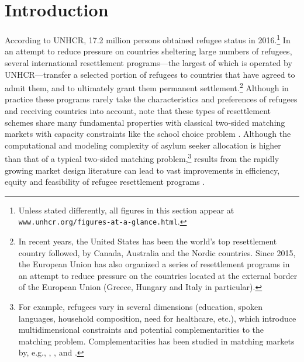 \documentclass[12pt,fleqn]{article}
\begin{document}

\section{Introduction}
According to UNHCR, 17.2 million persons obtained refugee status in 2016.\footnote{Unless stated differently, all figures in this section appear at \texttt{www.unhcr.org/figures-at-a-glance.html}.} In an attempt to reduce pressure on countries sheltering large numbers of refugees, several international resettlement programs---the largest of which is operated by UNHCR---transfer a selected portion of refugees to countries that have agreed to admit them, and to ultimately grant them permanent settlement.\footnote{In recent years, the United States has been the world's top resettlement country followed, by Canada, Australia and the Nordic countries. Since 2015, the European Union has also organized a series of resettlement programs in an attempt to reduce pressure on the countries located at the external border of the European Union (Greece, Hungary and Italy in particular).} Although in practice these programs rarely take the characteristics and preferences of refugees and receiving countries into account, \citet{bib:JonesTeytelboym2016b,bib:JonesTeytelboym2016a} note that these types of resettlement schemes share many fundamental properties with classical two-sided matching markets with capacity constraints like the school choice problem \citep{bib:AbdulkadirougluSonmez}. Although the computational and modeling complexity of asylum seeker allocation is higher than that of a typical two-sided matching problem,\footnote{For example, refugees vary in several dimensions (education, spoken languages, household composition, need for healthcare, etc.), which introduce multidimensional constraints and potential complementarities to the matching problem. Complementarities has been studied in matching markets by, e.g., \citet{bib:HatfieldKominers}, \citet{bib:PathakRoth}, \citet{bib:Pycia} and \citet{bib:RothPeranson}.} results from the rapidly growing market design literature can lead to vast improvements in efficiency, equity and feasibility of refugee resettlement programs \citep{bib:Andersson,bib:BansakEtAl,bib:DelacretazEtAl2016,bib:JonesTeytelboym2016b, bib:JonesTeytelboym2016a}.
\end{document}

